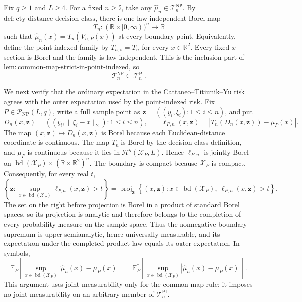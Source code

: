 Fix \(q\geq1\) and \(L\geq4\).  For a fixed \(n\geq2\), take any \(\widehat\mu_n\in\mathcal T_n^{\mathrm{NP}}\).  By \(\mathrm{def:cty\text{-}distance\text{-}decision\text{-}class}\), there is one law-independent Borel map
\[
 T_n:(\mathbb R\times[0,\infty))^n\longrightarrow\mathbb R
\]
such that \(\widehat\mu_n(x)=T_n(V_{n,P}(x))\) at every boundary point.  Equivalently, define the point-indexed family by \(T_{n,x}=T_n\) for every \(x\in\mathbb R^2\).  Every fixed-\(x\) section is Borel and the family is law-independent.  This is the inclusion part of \(\mathrm{lem:common\text{-}map\text{-}strict\text{-}in\text{-}point\text{-}indexed}\), so
\[
 \mathcal T_n^{\mathrm{NP}}\subseteq\mathcal T_n^{\mathrm{PI}}.
\]

We next verify that the ordinary expectation in the Cattaneo--Titiunik--Yu risk agrees with the outer expectation used by the point-indexed risk.  Fix \(P\in\mathcal P_{\mathrm{NP}}(L,q)\), write a full sample point as \(\mathbf z=((y_i,\xi_i):1\leq i\leq n)\), and put
\[
 D_n(x,\mathbf z)=((y_i,\lVert\xi_i-x\rVert_2):1\leq i\leq n),
 \qquad
 \ell_{P,n}(x,\mathbf z)
 =\left|T_n(D_n(x,\mathbf z))-\mu_P(x)\right|.
\]
The map \((x,\mathbf z)\mapsto D_n(x,\mathbf z)\) is Borel because each Euclidean-distance coordinate is continuous.  The map \(T_n\) is Borel by the decision-class definition, and \(\mu_P\) is continuous because it lies in \(\mathcal H^q(\mathcal X_P,L)\).  Hence \(\ell_{P,n}\) is jointly Borel on \(\operatorname{bd}(\mathcal X_P)\times(\mathbb R\times\mathbb R^2)^n\).  The boundary is compact because \(\mathcal X_P\) is compact.  Consequently, for every real \(t\),
\[
 \left\{\mathbf z:
   \sup_{x\in\operatorname{bd}(\mathcal X_P)}
   \ell_{P,n}(x,\mathbf z)>t
 \right\}
 =\operatorname{proj}_{\mathbf z}
 \left\{(x,\mathbf z):
   x\in\operatorname{bd}(\mathcal X_P),\ 
   \ell_{P,n}(x,\mathbf z)>t
 \right\}.
\]
The set on the right before projection is Borel in a product of standard Borel spaces, so its projection is analytic and therefore belongs to the completion of every probability measure on the sample space.  Thus the nonnegative boundary supremum is upper semianalytic, hence universally measurable, and its expectation under the completed product law equals its outer expectation.  In symbols,
\[
 \mathbb E_P\!\left[
   \sup_{x\in\operatorname{bd}(\mathcal X_P)}
   |\widehat\mu_n(x)-\mu_P(x)|
 \right]
 =
 \mathbb E_P^*\!\left[
   \sup_{x\in\operatorname{bd}(\mathcal X_P)}
   |\widehat\mu_n(x)-\mu_P(x)|
 \right].
\]
This argument uses joint measurability only for the common-map rule; it imposes no joint measurability on an arbitrary member of \(\mathcal T_n^{\mathrm{PI}}\).

